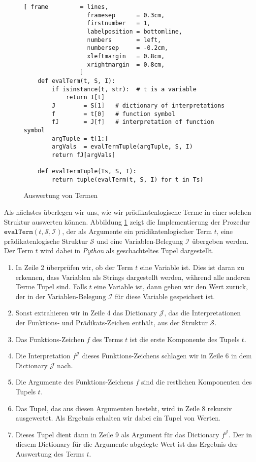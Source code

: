 \begin{figure}[!ht]
\centering
\begin{Verbatim}[ frame         = lines, 
                  framesep      = 0.3cm, 
                  firstnumber   = 1,
                  labelposition = bottomline,
                  numbers       = left,
                  numbersep     = -0.2cm,
                  xleftmargin   = 0.8cm,
                  xrightmargin  = 0.8cm,
                ]
    def evalTerm(t, S, I):
        if isinstance(t, str):  # t is a variable
            return I[t]
        J        = S[1]   # dictionary of interpretations
        f        = t[0]   # function symbol
        fJ       = J[f]   # interpretation of function symbol
        argTuple = t[1:]
        argVals  = evalTermTuple(argTuple, S, I)
        return fJ[argVals]
        
    def evalTermTuple(Ts, S, I):
        return tuple(evalTerm(t, S, I) for t in Ts)    
\end{Verbatim}
\vspace*{-0.3cm}
\caption{Auswertung von Termen}
\label{fig:evalTerm.ipynb}
\end{figure}


Als nächstes überlegen wir uns, wie wir prädikatenlogische Terme in einer solchen Struktur
auswerten können.  Abbildung \ref{fig:evalTerm.ipynb} zeigt die Implementierung der Prozedur
$\texttt{evalTerm}(t, \mathcal{S}, \mathcal{I})$, der als Argumente ein prädikatenlogischer Term $t$, eine
prädikatenlogische Struktur $\mathcal{S}$ und eine Variablen-Belegung $\mathcal{I}$ übergeben werden.  Der Term
$t$ wird dabei in \textsl{Python} als geschachteltes Tupel dargestellt.
\begin{enumerate}
\item In Zeile 2 überprüfen wir, ob der Term $t$ eine Variable ist.  Dies ist daran zu erkennen, dass Variablen
      als Strings dargestellt werden, während alle anderen Terme Tupel sind.  Falls $t$ eine Variable ist, dann 
      geben wir den Wert zurück, der in der Variablen-Belegung $\mathcal{I}$ für diese Variable gespeichert
      ist.
\item Sonst extrahieren wir in Zeile 4 das Dictionary $\mathcal{J}$, das die Interpretationen der Funktions- und
      Prädikats-Zeichen enthält, aus der Struktur $\mathcal{S}$.
\item Das Funktions-Zeichen $f$ des Terms $t$ ist die erste Komponente des Tupels $t$.
\item Die Interpretation $f^\mathcal{J}$ dieses Funktions-Zeichens schlagen wir in Zeile 6 in dem Dictionary
      $\mathcal{J}$ nach.
\item Die Argumente des Funktions-Zeichens $f$ sind die restlichen Komponenten des Tupels $t$.
\item Das Tupel, das aus diesen Argumenten besteht, wird in Zeile 8 rekursiv ausgewertet.
      Als Ergebnis erhalten wir dabei ein Tupel von Werten.
\item Dieses Tupel dient dann in Zeile 9 als Argument für das Dictionary $f^\mathcal{J}$.  Der in diesem
      Dictionary für die Argumente abgelegte Wert ist das Ergebnis der Auswertung des Terms $t$.
\end{enumerate}


